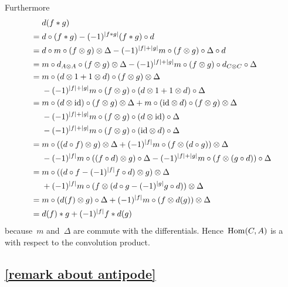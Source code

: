 Furthermore
\begingroup
\allowdisplaybreaks
\begin{align*}
  {}&
  d(f * g)
  \\
  ={}&
  d \circ (f * g)
  -
  (-1)^{\lvert f * g\rvert} (f * g) \circ d
  \\
  ={}&
  d \circ m \circ (f \otimes g) \otimes \Delta
  -
  (-1)^{\lvert f\rvert + \lvert g\rvert}
  m \circ (f \otimes g) \circ \Delta \circ d
  \\
  ={}&
  m \circ d_{A \otimes A} \circ (f \otimes g) \otimes \Delta
  -
  (-1)^{\lvert f\rvert + \lvert g\rvert}
  m \circ (f \otimes g) \circ d_{C \otimes C} \circ \Delta
  \\
  ={}&
  m \circ (d \otimes 1 + 1 \otimes d) \circ (f \otimes g) \otimes \Delta
  \\
  {}&
  -
  (-1)^{\lvert f\rvert + \lvert g\rvert}
  m \circ (f \otimes g) \circ (d \otimes 1 + 1 \otimes d) \circ \Delta
  \\
  ={}&
    m \circ (d \otimes {\operatorname{id}}) \circ (f \otimes g) \otimes \Delta
  + m \circ ({\operatorname{id}} \otimes d) \circ (f \otimes g) \otimes \Delta
  \\
  {}&
  - (-1)^{\lvert f\rvert + \lvert g\rvert} m \circ (f \otimes g) \circ (d \otimes {\operatorname{id}}) \circ \Delta
  \\
  {}&
  - (-1)^{\lvert f\rvert + \lvert g\rvert} m \circ (f \otimes g) \circ ({\operatorname{id}} \otimes d) \circ \Delta
  \\
  ={}&
    m \circ ((d \circ f) \otimes g) \otimes \Delta
  + (-1)^{\lvert f\rvert} m \circ (f \otimes (d \circ g)) \otimes \Delta
  \\
  {}&
  - (-1)^{\lvert f\rvert} m \circ ((f \circ d) \otimes g) \circ \Delta
  - (-1)^{\lvert f\rvert + \lvert g\rvert} m \circ (f \otimes (g \circ d))\circ \Delta
  \\
  ={}&
    m \circ ((d \circ f - (-1)^{\lvert f\rvert} f \circ d) \otimes g) \otimes \Delta
  \\
  {}&
  + (-1)^{\lvert f\rvert} m \circ (f \otimes (d \circ g - (-1)^{\lvert g\rvert} g \circ d)) \otimes \Delta
  \\
  ={}&
    m \circ (d(f) \otimes g) \circ \Delta
  + (-1)^{\lvert f\rvert} m \circ (f \otimes d(g)) \otimes \Delta
  \\
  ={}&
  d(f) * g + (-1)^{\lvert f\rvert} f * d(g)
\end{align*}
\endgroup
because~$m$ and~$\Delta$ are commute with the differentials.
Hence~$\operatorname{Hom}(C,A)$ is a {\dga} with respect to the convolution product.





\subsection{\cref{remark about antipode}}
\label{remark about antipode proof}

